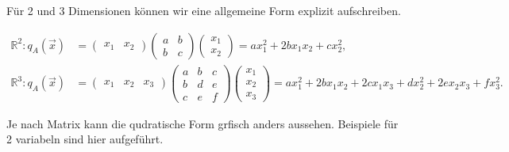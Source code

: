 Für 2 und 3 Dimensionen können wir eine allgemeine Form explizit aufschreiben. 

\begin{equation*}
    \begin{aligned}
        \mathbb{R}^2: q_A(\vec{x}) &= \begin{pmatrix} x_1 & x_2 \end{pmatrix} \begin{pmatrix} a & b \\ b & c \end{pmatrix} \begin{pmatrix} x_1 \\ x_2 \end{pmatrix} = ax_1^2 + 2bx_1x_2 + cx_2^2, \\[1em]
        \mathbb{R}^3: q_A(\vec{x}) &= \begin{pmatrix} x_1 & x_2 & x_3 \end{pmatrix} \begin{pmatrix} a & b & c \\ b & d & e \\ c & e & f \end{pmatrix} \begin{pmatrix} x_1 \\ x_2 \\ x_3 \end{pmatrix} = ax_1^2 + 2bx_1x_2 + 2cx_1x_3 + dx_2^2 + 2ex_2x_3 + fx_3^2.
    \end{aligned}
\end{equation*}

Je nach Matrix kann die qudratische Form grfisch anders aussehen. Beispiele für 2 variabeln sind hier aufgeführt.

